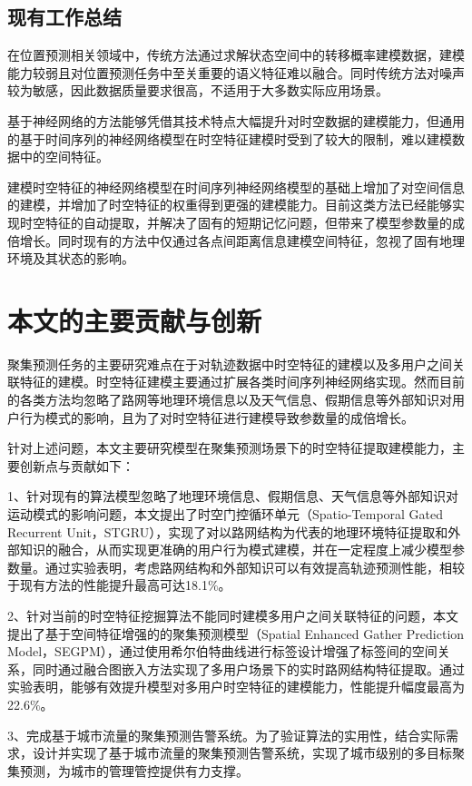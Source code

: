 \documentclass[master]{thesis-uestc}
\begin{document}
\subsection{现有工作总结}
在位置预测相关领域中，传统方法通过求解状态空间中的转移概率建模数据，建模能力较弱且对位置预测任务中至关重要的语义特征难以融合。同时传统方法对噪声较为敏感，因此数据质量要求很高，不适用于大多数实际应用场景。

基于神经网络的方法能够凭借其技术特点大幅提升对时空数据的建模能力，但通用的基于时间序列的神经网络模型在时空特征建模时受到了较大的限制，难以建模数据中的空间特征。

建模时空特征的神经网络模型在时间序列神经网络模型的基础上增加了对空间信息的建模，并增加了时空特征的权重得到更强的建模能力。目前这类方法已经能够实现时空特征的自动提取，并解决了固有的短期记忆问题，但带来了模型参数量的成倍增长。同时现有的方法中仅通过各点间距离信息建模空间特征，忽视了固有地理环境及其状态的影响。

\section{本文的主要贡献与创新}
聚集预测任务的主要研究难点在于对轨迹数据中时空特征的建模以及多用户之间关联特征的建模。时空特征建模主要通过扩展各类时间序列神经网络实现。然而目前的各类方法均忽略了路网等地理环境信息以及天气信息、假期信息等外部知识对用户行为模式的影响，且为了对时空特征进行建模导致参数量的成倍增长。

针对上述问题，本文主要研究模型在聚集预测场景下的时空特征提取建模能力，主要创新点与贡献如下：

1、针对现有的算法模型忽略了地理环境信息、假期信息、天气信息等外部知识对运动模式的影响问题，本文提出了时空门控循环单元（Spatio-Temporal Gated Recurrent Unit，STGRU），实现了对以路网结构为代表的地理环境特征提取和外部知识的融合，从而实现更准确的用户行为模式建模，并在一定程度上减少模型参数量。通过实验表明，考虑路网结构和外部知识可以有效提高轨迹预测性能，相较于现有方法的性能提升最高可达18.1$\%$。

2、针对当前的时空特征挖掘算法不能同时建模多用户之间关联特征的问题，本文提出了基于空间特征增强的的聚集预测模型（Spatial Enhanced Gather Prediction Model，SEGPM），通过使用希尔伯特曲线进行标签设计增强了标签间的空间关系，同时通过融合图嵌入方法实现了多用户场景下的实时路网结构特征提取。通过实验表明，能够有效提升模型对多用户时空特征的建模能力，性能提升幅度最高为22.6$\%$。

3、完成基于城市流量的聚集预测告警系统。为了验证算法的实用性，结合实际需求，设计并实现了基于城市流量的聚集预测告警系统，实现了城市级别的多目标聚集预测，为城市的管理管控提供有力支撑。
\end{document}
